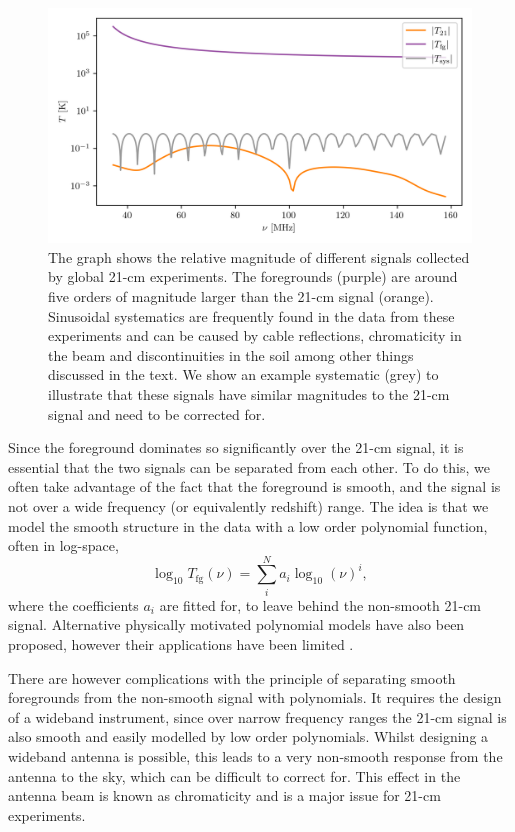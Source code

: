 \begin{figure}
    \centering
    \includegraphics{introduction/figs/the_data.png}
    \caption{The graph shows the relative magnitude of different signals collected by global 21-cm experiments. The foregrounds (purple) are around five orders of magnitude larger than the 21-cm signal (orange). Sinusoidal systematics are frequently found in the data from these experiments and can be caused by cable reflections, chromaticity in the beam and discontinuities in the soil among other things discussed in the text. We show an example systematic (grey) to illustrate that these signals have similar magnitudes to the 21-cm signal and need to be corrected for.}
    \label{fig:relative_signal_magnitudes}
\end{figure}

Since the foreground dominates so significantly over the 21-cm signal, it is essential that the two signals can be separated from each other. To do this, we often take advantage of the fact that the foreground is smooth, and the signal is not over a wide frequency (or equivalently redshift) range. The idea is that we model the smooth structure in the data with a low order polynomial function, often in log-space,
\begin{equation}
    \log_{10}T_\mathrm{fg}(\nu) = \sum_i^N a_i \log_{10}(\nu)^i,
\end{equation}
where the coefficients $a_i$ are fitted for, to leave behind the non-smooth 21-cm signal. Alternative physically motivated polynomial models have also been proposed, however their applications have been limited \cite{Bowman_edges_2018}.

There are however complications with the principle of separating smooth foregrounds from the non-smooth signal with polynomials. It requires the design of a wideband instrument, since over narrow frequency ranges the 21-cm signal is also smooth and easily modelled by low order polynomials. Whilst designing a wideband antenna is possible, this leads to a very non-smooth response from the antenna to the sky, which can be difficult to correct for. This effect in the antenna beam is known as chromaticity and is a major issue for 21-cm experiments.


